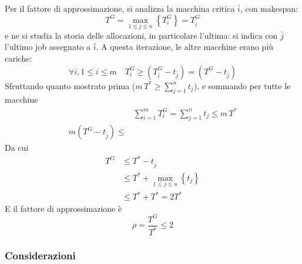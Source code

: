 Per il fattore di approssimazione, si analizza la macchina critica $\bar{i}$, con makespan:
\begin{equation*}
    T^G = 
    \max_{1 \leq j \leq n} \left\{ T_i^G \right\}
    =
    T_{\bar{i}}^{G}
\end{equation*}
e ne si studia la storia delle allocazioni, in particolare l'ultima: si indica con $\bar{j}$ l'ultimo job assegnato a $\bar{i}$.
A questa iterazione, le altre macchine erano più cariche:
\begin{equation*}
    \forall i
    ,
    1 \leq i \leq m
    \quad
    T_{i}^{G}
    \geq
    \left( 
        T_{\bar{i}}^{G}
        -
        t_{\bar{j}}
    \right)
    =
    \left( 
        T^{G}
        -
        t_{\bar{j}}
    \right)
\end{equation*}
Sfruttando quanto mostrato prima
($
    m \, T^*
    \geq
    \sum_{j=1}^{n} t_j
$), e sommando per tutte le macchine
\begin{align*}
    &
    \sum_{i=1}^{m}
    T_{i}^{G}
    =
    \sum_{j=1}^{n} t_j
    \leq
    m \, T^*
    \\
    m \left( 
        T^{G}
        -
        t_{\bar{j}}
    \right)
    \leq
    &
\end{align*}
Da cui
\begin{align*}
    T^G
    &
    \leq
    T^* -
    t_{\bar{j}}
    \\
    & \leq
    T^* +
    \max_{1 \leq j \leq n}
    \left\{ 
        t_j
    \right\}
    \\
    & \leq
    T^* +
    T^*
    = 2 
    T^*
\end{align*}
E il fattore di approssimazione è
\begin{equation*}
    \rho = \frac{
        T^G
    }{
        T^*
    }
    \leq 2
\end{equation*}

\subsubsection{Considerazioni}

